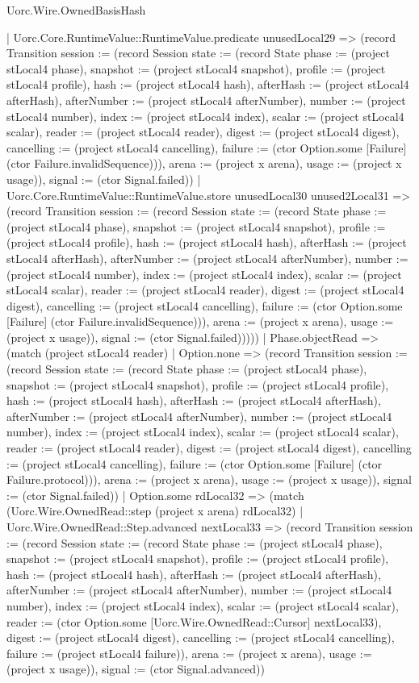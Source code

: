 \begin{lexlean}{Uorc.Wire.OwnedBasisHash}
\begin{semanticmodule}
{          | Uorc.Core.RuntimeValue::RuntimeValue.predicate unusedLocal29 => (record Transition {session := (record Session {state := (record State {phase := (project stLocal4 phase), snapshot := (project stLocal4 snapshot), profile := (project stLocal4 profile), hash := (project stLocal4 hash), afterHash := (project stLocal4 afterHash), afterNumber := (project stLocal4 afterNumber), number := (project stLocal4 number), index := (project stLocal4 index), scalar := (project stLocal4 scalar), reader := (project stLocal4 reader), digest := (project stLocal4 digest), cancelling := (project stLocal4 cancelling), failure := (ctor Option.some [Failure] (ctor Failure.invalidSequence))}), arena := (project x arena), usage := (project x usage)}), signal := (ctor Signal.failed)})
          | Uorc.Core.RuntimeValue::RuntimeValue.store unusedLocal30 unused2Local31 => (record Transition {session := (record Session {state := (record State {phase := (project stLocal4 phase), snapshot := (project stLocal4 snapshot), profile := (project stLocal4 profile), hash := (project stLocal4 hash), afterHash := (project stLocal4 afterHash), afterNumber := (project stLocal4 afterNumber), number := (project stLocal4 number), index := (project stLocal4 index), scalar := (project stLocal4 scalar), reader := (project stLocal4 reader), digest := (project stLocal4 digest), cancelling := (project stLocal4 cancelling), failure := (ctor Option.some [Failure] (ctor Failure.invalidSequence))}), arena := (project x arena), usage := (project x usage)}), signal := (ctor Signal.failed)}))))
      | Phase.objectRead => (match (project stLocal4 reader)
        | Option.none => (record Transition {session := (record Session {state := (record State {phase := (project stLocal4 phase), snapshot := (project stLocal4 snapshot), profile := (project stLocal4 profile), hash := (project stLocal4 hash), afterHash := (project stLocal4 afterHash), afterNumber := (project stLocal4 afterNumber), number := (project stLocal4 number), index := (project stLocal4 index), scalar := (project stLocal4 scalar), reader := (project stLocal4 reader), digest := (project stLocal4 digest), cancelling := (project stLocal4 cancelling), failure := (ctor Option.some [Failure] (ctor Failure.protocol))}), arena := (project x arena), usage := (project x usage)}), signal := (ctor Signal.failed)})
        | Option.some rdLocal32 => (match (Uorc.Wire.OwnedRead::step (project x arena) rdLocal32)
          | Uorc.Wire.OwnedRead::Step.advanced nextLocal33 => (record Transition {session := (record Session {state := (record State {phase := (project stLocal4 phase), snapshot := (project stLocal4 snapshot), profile := (project stLocal4 profile), hash := (project stLocal4 hash), afterHash := (project stLocal4 afterHash), afterNumber := (project stLocal4 afterNumber), number := (project stLocal4 number), index := (project stLocal4 index), scalar := (project stLocal4 scalar), reader := (ctor Option.some [Uorc.Wire.OwnedRead::Cursor] nextLocal33), digest := (project stLocal4 digest), cancelling := (project stLocal4 cancelling), failure := (project stLocal4 failure)}), arena := (project x arena), usage := (project x usage)}), signal := (ctor Signal.advanced)})
}
\end{semanticmodule}
\end{lexlean}
